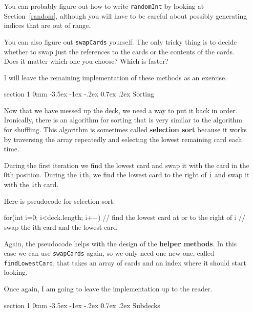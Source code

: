 \documentclass{book}
\makeatletter
\renewcommand{\section}{\@startsection 
    {section} {1} {0mm}%
    {-3.5ex \@plus -1ex \@minus -.2ex}%
    {0.7ex \@plus.2ex}%
    {\normalfont\Large\bfseries}}
\makeatother
\begin{document}

You can probably figure out how to write {\tt randomInt}
by looking at Section~\ref{random}, although you will have to
be careful about possibly generating indices that are out of range.


You can also figure out {\tt swapCards} yourself.  The only
tricky thing is to decide whether to swap just the references
to the cards or the contents of the cards.  Does it matter
which one you choose?  Which is faster?

I will leave the remaining implementation of these methods
as an exercise.


\section{Sorting}
\label{sorting}

Now that we have messed up the deck, we need a way to put it
back in order.  Ironically, there is an algorithm for
sorting that is very similar to the algorithm for shuffling.
This algorithm is sometimes called {\bf selection sort}
because it works by traversing the array repeatedly and 
selecting the lowest remaining card each time.


During the first iteration we find the lowest card and swap
it with the card in the 0th position.  During the {\tt i}th, we find the
lowest card to the right of {\tt i} and swap it with the {\tt i}th
card.

Here is pseudocode for selection sort:

\begin{verbatimtab}
    for(int i=0; i<deck.length; i++) {
        // find the lowest card at or to the right of i
        // swap the ith card and the lowest card
    }
\end{verbatimtab}
%
Again, the pseudocode helps with the design of the {\bf helper
methods}.  In this case we can use {\tt swapCards} again,
so we only need one new one, called {\tt findLowestCard},
that takes an array of cards and an index where it should
start looking.


Once again, I am going to leave the implementation up to
the reader.


\section {Subdecks}
\end{document}

